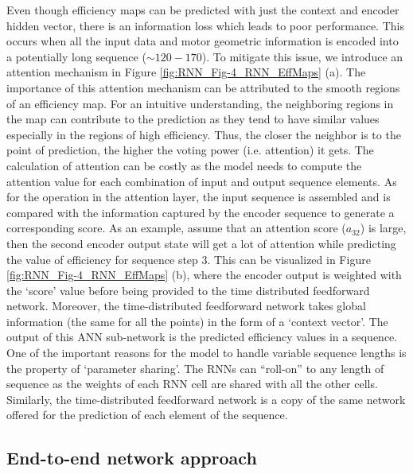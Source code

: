 Even though efficiency maps can be predicted with just the context and encoder hidden vector, there is an information loss which leads to poor performance. This occurs when all the input data and motor geometric information is encoded into a potentially long sequence ($ \sim 120-170$). To mitigate this issue, we introduce an attention mechanism \parencite{vaswani2017attention} in Figure \ref{fig:RNN_Fig-4_RNN_EffMaps} (a). The importance of this attention mechanism can be attributed to the smooth regions of an efficiency map. For an intuitive understanding, the neighboring regions in the map can contribute to the prediction as they tend to have similar values especially in the regions of high efficiency. Thus, the closer the neighbor is to the point of prediction, the higher the voting power (i.e. attention) it gets. The calculation of attention can be costly as the model needs to compute the attention value for each combination of input and output sequence elements. As for the operation in the attention layer, the input sequence is assembled and is compared with the information captured by the encoder sequence to generate a corresponding score. As an example, assume that an attention score ($a_{32}$) is large, then the second encoder output state will get a lot of attention while predicting the value of efficiency for sequence step 3. This can be visualized in Figure \ref{fig:RNN_Fig-4_RNN_EffMaps} (b), where the encoder output is weighted with the ‘score’ value before being provided to the time distributed feedforward network. Moreover, the time-distributed feedforward network takes global information (the same for all the points) in the form of a ‘context vector’. The output of this ANN sub-network is the predicted efficiency values in a sequence. One of the important reasons for the model to handle variable sequence lengths is the property of ‘parameter sharing’. The RNNs can “roll-on” to any length of sequence as the weights of each RNN cell are shared with all the other cells. Similarly, the time-distributed feedforward network is a copy of the same network offered for the prediction of each element of the sequence.

\subsection{End-to-end network approach}

